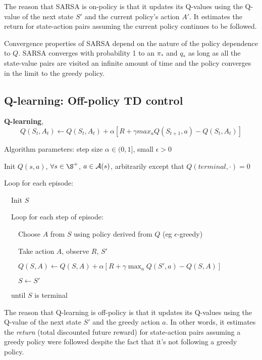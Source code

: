 \documentclass[sutton_barto_notes.tex]{subfiles}
\begin{document}
The reason that SARSA is on-policy is that it updates its Q-values using the Q-value of the next state $S'$ and the current policy's action $A'$. It estimates the return for state-action pairs assuming the current policy continues to be followed.

Convergence properties of SARSA depend on the nature of the policy dependence to $Q$. SARSA converges with probability 1 to an $\pi_*$ and $q_*$ as long as all the state-value pairs are visited an infinite amount of time and the policy converges in the limit to the greedy policy.

\subsection{Q-learning: Off-policy TD control}

\begin{definition}
\textbf{Q-learning},
$$Q(S_t,A_t)\leftarrow Q(S_t, A_t)+\alpha [R + \gamma max_a Q(S_{t+1}, a) - Q(S_t, A_t)]$$
\end{definition}

\begin{tcolorbox}[width=1.1\textwidth,title={Q-learning (off-policy TD control) for estimating $\pi\approx \pi_*$}]
Algorithm parameters: step size $\alpha \in (0,1]$, small $\epsilon > 0$

Init $Q(s,a)$, $\forall s \in \S^+$, $a \in \operatorname*{\mathcal{A}}(s)$, arbitrarily except that $Q(terminal,\cdot)=0$

Loop for each episode:

$\quad$Init $S$

$\quad$Loop for each step of episode:

$\quad\quad$Choose $A$ from $S$ using policy derived from $Q$ (eg $\epsilon$-greedy)

$\quad\quad$Take action $A$, observe $R$, $S'$

$\quad\quad Q(S, A) \leftarrow Q(S, A) + \alpha [ R + \gamma \max_a Q( S', a) - Q(S, A)]$

$\quad\quad S \leftarrow S'$

$\quad$until $S$ is terminal
\end{tcolorbox}

The reason that Q-learning is off-policy is that it updates its Q-values using the Q-value of the next state $S'$ and the greedy action $a$. In other words, it estimates the \textit{return} (total discounted future reward) for state-action pairs assuming a greedy policy were followed despite the fact that it's not following a greedy policy.
\end{document}
